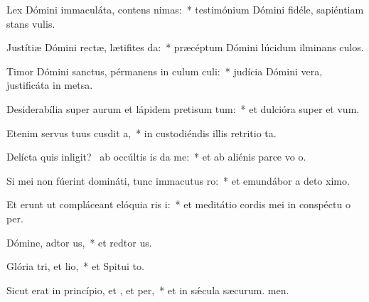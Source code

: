 \item Lex Dómini immaculáta, contens nimas:~* testimónium Dómini fidéle, sapiéntiam stans vulis.
\item Justítiæ Dómini rectæ, lætifites da:~* præcéptum Dómini lúcidum ilminans culos.
\item Timor Dómini sanctus, pérmanens in culum culi:~* judícia Dómini vera, justificáta in metsa.
\item Desiderabília super aurum et lápidem pretisum tum:~* et dulcióra super  et vum.
\item Etenim servus tuus cusdit a,~* in custodiéndis illis retritio ta.
\item Delícta quis inligit?~\pscross{} ab occúltis is da me:~* et ab aliénis parce vo o.
\item Si mei non fúerint domináti, tunc immacutus ro:~* et emundábor a deto ximo.
\item Et erunt ut compláceant elóquia ris i:~* et meditátio cordis mei in conspéctu o per.
\item Dómine, adtor us,~* et redtor us.
\item Glória tri, et lio,~* et Spitui to.
\item Sicut erat in princípio, et , et per,~* et in sǽcula sæcurum. men.
